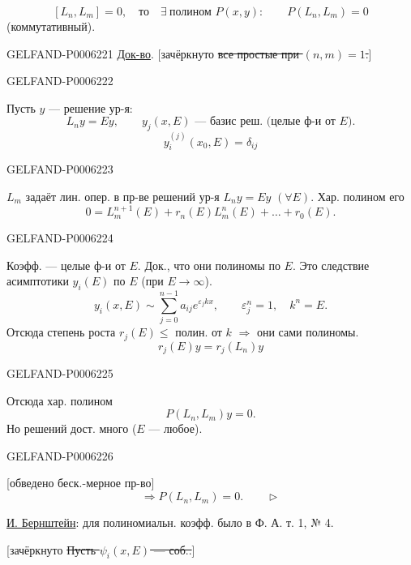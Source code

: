 \[
[L_n,L_m]=0,\quad\text{то}\quad\exists\ \text{полином }P(x,y):
\qquad P(L_n,L_m)=0
\]
(коммутативный).


\begin{GelfandAdjacentEvidence}{GELFAND-P000622}{1}
\underline{Док-во}. [зачёркнуто \sout{все простые при \((n,m)=1\).}]
\end{GelfandAdjacentEvidence}
\begin{GelfandAdjacentEvidence}{GELFAND-P000622}{2}

Пусть \(y\) — решение ур-я:
\[
L_ny=Ey,\qquad y_j(x,E)\text{ — базис реш. (целые ф-и от \(E\)).}
\]
\[
y_i^{(j)}(x_0,E)=\delta_{ij}
\]
\end{GelfandAdjacentEvidence}
\begin{GelfandAdjacentEvidence}{GELFAND-P000622}{3}

\(L_m\) задаёт лин. опер. в пр-ве решений ур-я \(L_ny=Ey\) \((\forall E)\).
Хар. полином его
\[
0=L_m^{n+1}(E)+r_n(E)L_m^n(E)+\ldots+r_0(E).
\]
\end{GelfandAdjacentEvidence}
\begin{GelfandAdjacentEvidence}{GELFAND-P000622}{4}

Коэфф. — целые ф-и от \(E\).
Док., что они полиномы по \(E\). Это следствие асимптотики \(y_i(E)\) по \(E\) (при \(E\to\infty\)).
\[
y_i(x,E)\sim\sum_{j=0}^{n-1}a_{ij}e^{\varepsilon_jkx},
\qquad\varepsilon_j^n=1,\quad k^n=E.
\]
Отсюда степень роста \(r_j(E)\le\) полин. от \(k\) \(\Rightarrow\) они сами полиномы.
\[
r_j(E)y=r_j(L_n)y
\]
\end{GelfandAdjacentEvidence}
\begin{GelfandAdjacentEvidence}{GELFAND-P000622}{5}

Отсюда хар. полином
\[
P(L_n,L_m)y=0.
\]
Но решений дост. много (\(E\) — любое).
\end{GelfandAdjacentEvidence}
\begin{GelfandAdjacentEvidence}{GELFAND-P000622}{6}

[обведено беск.-мерное пр-во]
\[
\Rightarrow P(L_n,L_m)=0.\qquad\triangleright
\]

\underline{И. Бернштейн}: для полиномиальн. коэфф. было в Ф. А. т. 1, № 4.

[зачёркнуто \sout{Пусть \(\psi_i(x,E)\) — соб..}]
\end{GelfandAdjacentEvidence}

